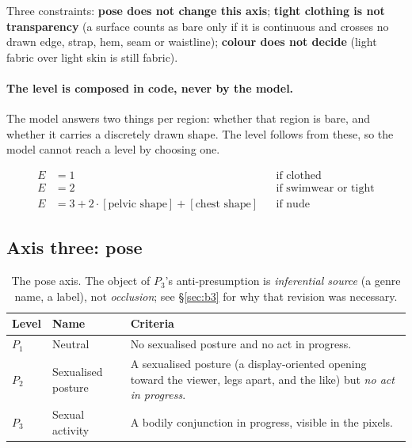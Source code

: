 \documentclass[11pt]{article}
\newcommand{\axe}{E}
\newcommand{\axp}{P}
\begin{document}
Three constraints: \textbf{pose does not change this axis}; \textbf{tight
clothing is not transparency} (a surface counts as bare only if it is
continuous and crosses no drawn edge, strap, hem, seam or waistline);
\textbf{colour does not decide} (light fabric over light skin is still
fabric).

\paragraph{The level is composed in code, never by the model.}
The model answers two things per region: whether that region is bare, and
whether it carries a discretely drawn shape. The level follows from these, so
the model cannot reach a level by choosing one.

\begin{equation}
\label{eq:compose}
\begin{aligned}
\axe &= 1 && \text{if clothed} \\
\axe &= 2 && \text{if swimwear or tight} \\
\axe &= 3 + 2\cdot\!\left[\text{pelvic shape}\right] + \left[\text{chest shape}\right] && \text{if nude}
\end{aligned}
\end{equation}

\subsection{Axis three: pose}
\label{sec:pose}

\begin{table}[H]
\centering\small
\begin{tabularx}{\linewidth}{@{}llX@{}}
\toprule
Level & Name & Criteria \\
\midrule
$\axp_1$ & Neutral & No sexualised posture and no act in progress. \\
$\axp_2$ & Sexualised posture & A sexualised posture (a display-oriented opening toward the viewer, legs apart, and the like) but \emph{no act in progress}. \\
$\axp_3$ & Sexual activity & A bodily conjunction in progress, visible in the pixels. \\
\bottomrule
\end{tabularx}
\caption{The pose axis. The object of $\axp_3$'s anti-presumption is
\emph{inferential source} (a genre name, a label), not \emph{occlusion}; see
\S\ref{sec:b3} for why that revision was necessary.}
\label{tab:pose}
\end{table}
\end{document}
